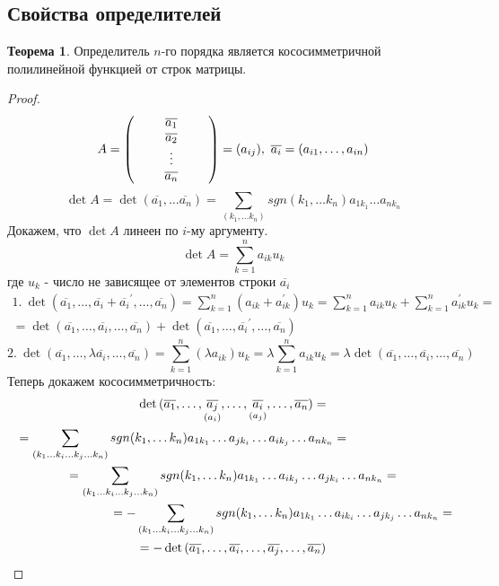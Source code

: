 \documentclass[a4paper, 12pt]{article}
\newcommand\tab[1][.5cm]{\hspace*{#1}}
\theoremstyle{definition}
\newtheorem*{theorem}{Теорема}
\begin{document}
  \subsection{Свойства определителей}
  \begin{theorem}
    Определитель $n$-го порядка является кососимметричной полилинейной функцией от строк матрицы.    
  \end{theorem} 
  \begin{proof}
    $$A=\begin{pmatrix}
      \tab & \overline{a_1} & \tab\\
      \null & \overline{a_2} & \null\\
      \null & \vdots & \null\\
      \null & \overline{a_n} & \null
    \end{pmatrix}=(a_{ij}),\ \overline{a_i}=(a_{i1},\dots, a_{in})$$
    $$\det{A}=\det{(\overline{a_1},\dots \overline{a_n})}=\sum\limits_{(k_1,\dots k_n)}sgn(k_1,\dots k_n)a_{1k_1}\dots a_{nk_n}$$
    Докажем, что $\det{A}$ линеен по $i$-му аргументу.
    $$\det{A}=\sum\limits_{k=1}^na_{ik}u_k$$
    где $u_k$ - число не зависящее от элементов строки $\overline{a_i}$
    \begin{multline*}
      1.\ \det(\overline{a_1},\dots,\overline{a_i}+{\overline{a_i}}^{\prime},\dots, \overline{a_n})=\sum\limits_{k=1}^n(a_{ik}+a_{ik}^{\prime})u_k=\sum\limits_{k=1}^na_{ik}u_k+\sum\limits_{k=1}^na_{ik}^{\prime}u_k=\\=\det{(\overline{a_1},\dots,\overline{a_i},\dots, \overline{a_n})}+\det{(\overline{a_1},\dots,\overline{a_i}^{\prime},\dots, \overline{a_n})}
    \end{multline*}
    $$2.\ \det{(\overline{a_1},\dots,\lambda\overline{a_i},\dots, \overline{a_n})}=\sum\limits_{k=1}^n(\lambda a_{ik})u_k=\lambda\sum\limits_{k=1}^na_{ik}u_k=\lambda\det{(\overline{a_1},\dots,\overline{a_i},\dots, \overline{a_n})}$$
    Теперь докажем кососимметричность:
    \begin{multline*}
    \det{(\overline{a_1},\dots,\underset{(a_i)}{\overline{a_j}},\dots,\underset{(a_j)}{\overline{a_i}},\dots,\overline{a_n})}=\\ \tab[-2.8cm]=\sum\limits_{(k_1\dots k_i\dots k_j\dots k_n)}sgn(k_1,\dots k_n)a_{1k_1}\dots a_{jk_i}\dots a_{ik_j}\dots a_{nk_n}=\\=\sum\limits_{(k_1\dots k_i\dots k_j\dots k_n)}sgn(k_1,\dots k_n)a_{1k_1}\dots a_{ik_j}\dots a_{jk_i}\dots a_{nk_n}=\\=-\sum\limits_{(k_1\dots k_i\dots k_j\dots k_n)}sgn(k_1,\dots k_n)a_{1k_1}\dots a_{ik_i}\dots a_{jk_j}\dots a_{nk_n}=\tab[-2.8cm]\\=-\det{(\overline{a_1},\dots,\overline{a_i},\dots,\overline{a_j},\dots,\overline{a_n})}
    \end{multline*}
  \end{proof} 
\end{document}
